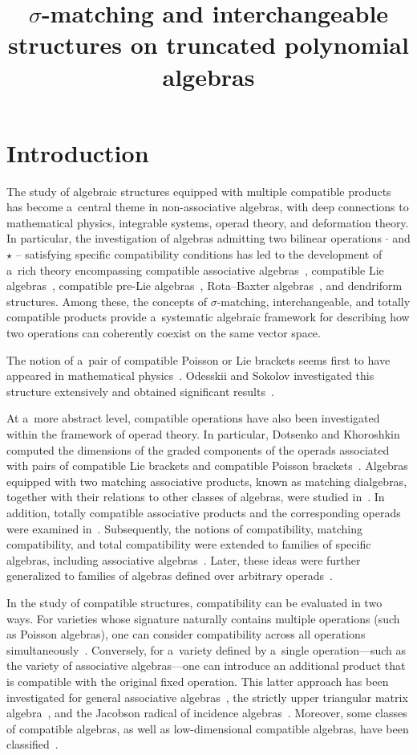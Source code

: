 \documentclass{jonasart}
\title{$\sigma$-matching and interchangeable structures on truncated polynomial algebras}
\begin{document}
	\section*{Introduction}

	The study of algebraic structures equipped with multiple compatible products has become a~central theme in non-associative algebras, with deep connections to mathematical physics, integrable systems, operad theory, and deformation theory. In particular, the investigation of algebras admitting two bilinear operations $\cdot$ and $\star$ -- satisfying specific compatibility conditions has led to the development of a~rich theory encompassing compatible associative algebras~\cite{Odesskii-Sokolov06, Dotsenko09}, compatible Lie algebras~\cite{Golubchik-Sokolov02, Golubchik-Sokolov05}, compatible pre-Lie algebras~\cite{Abdelwahab-Kaygorodov-Makhlouf24}, Rota–Baxter algebras~\cite{U, zgg20}, and dendriform structures. Among these, the concepts of $\sigma$-matching, interchangeable, and totally compatible products provide a~systematic algebraic framework for describing how two operations can coherently coexist on the same vector space.

	The notion of a~pair of compatible Poisson or Lie brackets seems first to have appeared in mathematical physics~\cite{Magri78,Reyman-Semenov89, Bolsinov91}. Odesskii and Sokolov investigated this structure extensively and obtained significant results~\cite{Odesskii-Sokolov06, Odesskii-Sokolov08}.

	At a~more abstract level, compatible operations have also been investigated within the framework of operad theory. In particular, Dotsenko and Khoroshkin computed the dimensions of the graded components of the operads associated with pairs of compatible Lie brackets and compatible Poisson brackets~\cite{Dotsenko-Khoroshkin07}. Algebras equipped with two matching associative products, known as matching dialgebras, together with their relations to other classes of algebras, were studied in~\cite{zbg12}. In addition, totally compatible associative products and the corresponding operads were examined in~\cite{zbg13,Zhang13}. Subsequently, the notions of compatibility, matching compatibility, and total compatibility were extended to families of specific algebras, including associative algebras~\cite{zgg20}. Later, these ideas were further generalized to families of algebras defined over arbitrary operads~\cite{zgg24}.

	In the study of compatible structures, compatibility can be evaluated in two ways. For varieties whose signature naturally contains multiple operations (such as Poisson algebras), one can consider compatibility across all operations simultaneously~\cite[Definition A]{Strohmayer08}. Conversely, for a~variety defined by a~single operation—such as the variety of associative algebras—one can introduce an additional product that is compatible with the original fixed operation. This latter approach has been investigated for general associative algebras~\cite{Khr}, the strictly upper triangular matrix algebra~\cite{Khr1}, and the Jacobson radical of incidence algebras~\cite{Khr2}. Moreover, some classes of compatible algebras, as well as low-dimensional compatible algebras, have been classified~\cite{aae24, Ladra-Cunha-Lopes24}.
\end{document}
